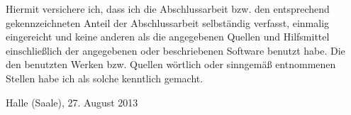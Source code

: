 Hiermit versichere ich, dass ich die Abschlussarbeit bzw. den entsprechend gekennzeichneten Anteil der Abschlussarbeit selbständig verfasst, einmalig eingereicht und keine anderen als die angegebenen Quellen und Hilfsmittel einschließlich der angegebenen oder beschriebenen Software benutzt habe. Die den benutzten Werken bzw. Quellen wörtlich oder sinngemäß entnommenen Stellen habe ich als solche kenntlich gemacht.


\vspace{10ex}

Halle (Saale), 27. August 2013 
